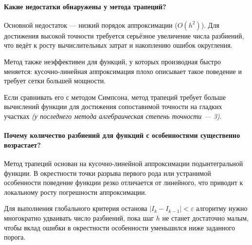 \paragraph{Какие недостатки обнаружены у метода трапеций?} Основной недостаток --- низкий порядок аппроксимации ($O(h^2)$). Для достижения высокой точности требуется серьёзное увеличение числа разбиений, что ведёт к росту вычислительных затрат и накоплению ошибок округления.

Метод также неэффективен для функций, у которых производная быстро меняется: кусочно-линейная аппроксимация плохо описывает такое поведение и требует сетки большей мощности.

Если сравнивать его с методом Симпсона, метод трапеций требует больше вычислений функции для достижения сопоставимой точности на гладких участках \textit{(у последнего метода алгебраическая степень точности --- 3)}.

\paragraph{Почему количество разбиений для функций с особенностями существенно возрастает?} Метод трапеций основан на кусочно-линейной аппроксимации подынтегральной функции. В окрестности точки разрыва первого рода или устранимой особенности поведение функции резко отличается от линейного, что приводит к локальному росту погрешности аппроксимации.

Для выполнения глобального критерия останова $|I_k - I_{k-1}| < \varepsilon$ алгоритму нужно многократно удваивать число разбиений, пока шаг $h$ не станет достаточно малым, чтобы вклад ошибки в окрестности особенности уменьшился ниже заданного порога.